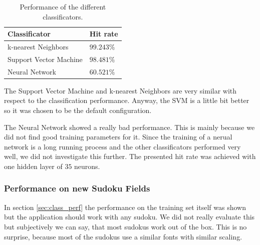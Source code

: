 \documentclass[
a4paper,     %
12pt         %
]{scrartcl}  %
\begin{document}
\begin{table}
    \centering
    \begin{tabular}{|l|l|}
    \hline
    \textbf{Classificator}          & \textbf{Hit rate}   \\ \hline
    k-nearest Neighbors    & $ 99.243\%$ \\ \hline
    Support Vector Machine & $ 98.481\%$    \\ \hline
    Neural Network         & $ 60.521\%$    \\ \hline
    \end{tabular}
    \caption{Performance of the different classificators.}
    \label{tab:class_perf}
\end{table}

The Support Vector Machine and k-nearest Neighbors are very similar with respect to the classification
performance. Anyway, the SVM is a little bit better so it was chosen to be the default configuration.

The Neural Network showed a really bad performance. This is mainly because we did not find good training
parameters for it. Since the training of a nerual network is a long running process and the other 
classificators performed very well, we did not investigate this further. The presented hit rate was
achieved with one hidden layer of $35$ neurons.

\subsubsection{Performance on new Sudoku Fields}

In section \ref{sec:class_perf} the performance on the training set itself was shown but the application
should work with any sudoku. We did not really evaluate this but subjectively we can say, that most
sudokus work out of the box. This is no surprise, because most of the sudokus use a similar fonts with
similar scaling.
\end{document}

